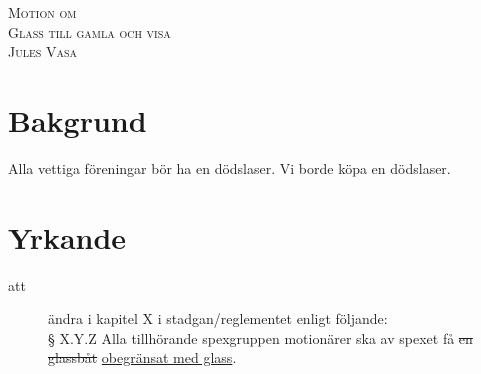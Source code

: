 \documentclass[a4paper]{article}
\newcommand{\motionsnamn}{Glass till gamla och visa}
\newcommand{\motionar}{Jules Vasa}
\begin{document}
\begin{center}
\textsc{\Huge Motion om}\\[0.5cm]
\textsc{\huge \motionsnamn}\\[0.5cm]
\textsc{\large \motionar\\}

\end{center}

\section{Bakgrund}

Alla vettiga föreningar bör ha en dödslaser. Vi borde köpa en dödslaser.

\section{Yrkande}
\begin{description}
	\item [att] ändra i kapitel X i stadgan/reglementet enligt följande:\\
 § X.Y.Z Alla tillhörande spexgruppen motionärer ska av spexet få \sout{en glassbåt} \underline{obegränsat med glass}.
\end{description}
\end{document}
